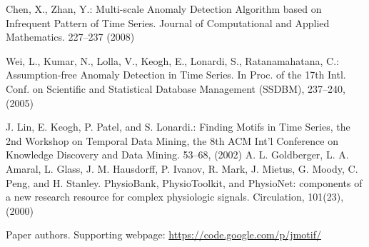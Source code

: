 \documentclass{llncs}
\begin{document}
\begin{thebibliography}{4}
 Chen, X., Zhan, Y.:
Multi-scale Anomaly Detection Algorithm based on Infrequent Pattern of Time Series.
Journal of Computational and Applied Mathematics. 227--237 (2008)

 Wei, L., Kumar, N., Lolla, V., Keogh, E., Lonardi, S., Ratanamahatana, C.:
Assumption-free Anomaly Detection in Time Series.
In Proc. of the 17th Intl. Conf. on Scientific and Statistical Database Management (SSDBM), 237--240, (2005)

J. Lin, E. Keogh, P. Patel, and S. Lonardi.: 
Finding Motifs in Time Series, the 2nd Workshop on Temporal Data Mining, the 8th ACM Int'l Conference on Knowledge Discovery and Data Mining. 53--68, (2002)
\enlargethispage{\baselineskip}
A. L. Goldberger, L. A. Amaral, L. Glass, J. M. Hausdorff, P. Ivanov, R. Mark, J.  Mietus, G. Moody, C. Peng, and H. Stanley. 
PhysioBank, PhysioToolkit, and PhysioNet: components of a new research resource for complex physiologic signals. 
Circulation, 101(23), (2000)

Paper authors. Supporting webpage:
\url{https://code.google.com/p/jmotif/}

\end{thebibliography}
\end{document}
